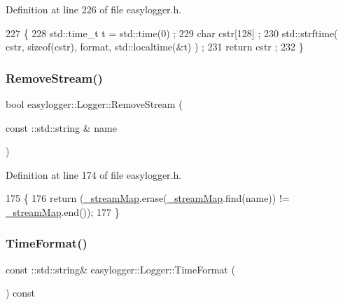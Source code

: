 Definition at line 226 of file easylogger.\+h.


\begin{DoxyCode}
227         \{
228             std::time\_t t = std::time(0) ;
229             \textcolor{keywordtype}{char} cstr[128] ;
230             std::strftime( cstr, \textcolor{keyword}{sizeof}(cstr), format, std::localtime(&t) ) ;
231             \textcolor{keywordflow}{return} cstr ;
232         \}
\end{DoxyCode}
\mbox{\label{classeasylogger_1_1_logger_a5fbcc23c2e8defc0862d48844703cdd2}} 
\subsubsection{\texorpdfstring{Remove\+Stream()}{RemoveStream()}}
{\footnotesize\ttfamily bool easylogger\+::\+Logger\+::\+Remove\+Stream (\begin{DoxyParamCaption}\item[{const \+::std\+::string \&}]{name }\end{DoxyParamCaption})\hspace{0.3cm}{\ttfamily [inline]}}



Definition at line 174 of file easylogger.\+h.


\begin{DoxyCode}
175         \{
176             \textcolor{keywordflow}{return} (\mbox{\hyperlink{classeasylogger_1_1_logger_a9290bed24c12786abef2c421158268f8}{\_streamMap}}.erase(\mbox{\hyperlink{classeasylogger_1_1_logger_a9290bed24c12786abef2c421158268f8}{\_streamMap}}.find(name)) != 
      \mbox{\hyperlink{classeasylogger_1_1_logger_a9290bed24c12786abef2c421158268f8}{\_streamMap}}.end());
177         \}
\end{DoxyCode}
\mbox{\label{classeasylogger_1_1_logger_ae4f6966ba512d06584b83118909a2f73}} 
\subsubsection{\texorpdfstring{Time\+Format()}{TimeFormat()}\hspace{0.1cm}{\footnotesize\ttfamily [1/2]}}
{\footnotesize\ttfamily const \+::std\+::string\& easylogger\+::\+Logger\+::\+Time\+Format (\begin{DoxyParamCaption}{ }\end{DoxyParamCaption}) const\hspace{0.3cm}{\ttfamily [inline]}}

